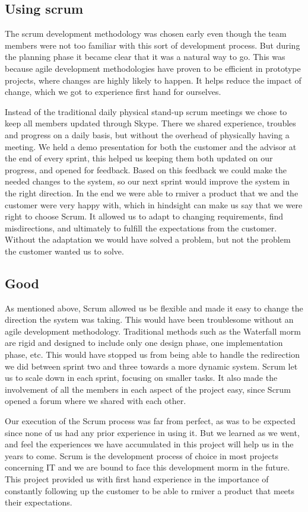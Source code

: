 \subsection*{Using scrum}
The scrum development methodology was chosen early even though the team members were not too familiar with this sort of development process. But during the planning phase it became clear that it was a natural way to go. This was because agile development methodologies have proven to be efficient in prototype projects, where changes are highly likely to happen. It helps reduce the impact of change, which we got to experience first hand for ourselves.

Instead of the traditional daily physical stand-up scrum meetings we chose to keep all members updated through Skype. There we shared experience, troubles and progress on a daily basis, but without the overhead of physically having a meeting. We held a demo presentation for both the customer and the advisor at the end of every sprint, this helped us keeping them both updated on our progress, and opened for feedback. Based on this feedback we could make the needed changes to the system, so our next sprint would improve the system in the right direction. In the end we were able to rmiver a product that we and the customer were very happy with, which in hindsight can make us say that we were right to choose Scrum. It allowed us to adapt to changing requirements, find misdirections, and ultimately to fulfill the expectations from the customer. Without the adaptation we would have solved a problem, but not the problem the customer wanted us to solve.

\subsection*{Good}
As mentioned above, Scrum allowed us be flexible and made it easy to change the direction the system was taking. This would have been troublesome without an agile development methodology. Traditional methods such as the Waterfall morm are rigid and designed to include only one design phase, one implementation phase, etc. This would have stopped us from being able to handle the redirection we did between sprint two and three towards a more dynamic system. Scrum let us to scale down in each sprint, focusing on smaller tasks. It also made the involvement of all the members in each aspect of the project easy, since Scrum opened a forum where we shared with each other.

Our execution of the Scrum process was far from perfect, as was to be expected since none of us had any prior experience in using it. But we learned as we went, and feel the experiences we have accumulated in this project will help us in the years to come. Scrum is the development process of choice in most projects concerning IT and we are bound to face this development morm in the future. This project provided us with first hand experience in the importance of constantly following up the customer to be able to rmiver a product that meets their expectations.

